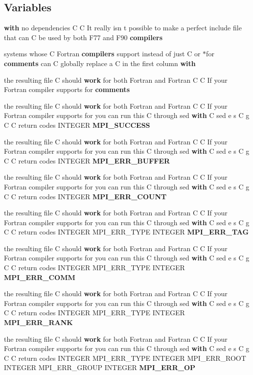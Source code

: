 \subsection*{Variables}
\begin{CompactItemize}
\item 
{\bf with} no dependencies C C It really isn t possible to make a perfect include file that can C be used by both F77 and F90 {\bf compilers}
\item 
systems whose C Fortran {\bf compilers} support instead of just C or $\ast$for {\bf comments} can C globally replace a C in the first column {\bf with}
\item 
the resulting file C should {\bf work} for both Fortran and Fortran C C If your Fortran compiler supports for {\bf comments}
\item 
the resulting file C should {\bf work} for both Fortran and Fortran C C If your Fortran compiler supports for you can run this C through sed {\bf with} C sed e s C g C C return codes INTEGER {\bf MPI\_\-SUCCESS}
\item 
the resulting file C should {\bf work} for both Fortran and Fortran C C If your Fortran compiler supports for you can run this C through sed {\bf with} C sed e s C g C C return codes INTEGER {\bf MPI\_\-ERR\_\-BUFFER}
\item 
the resulting file C should {\bf work} for both Fortran and Fortran C C If your Fortran compiler supports for you can run this C through sed {\bf with} C sed e s C g C C return codes INTEGER {\bf MPI\_\-ERR\_\-COUNT}
\item 
the resulting file C should {\bf work} for both Fortran and Fortran C C If your Fortran compiler supports for you can run this C through sed {\bf with} C sed e s C g C C return codes INTEGER MPI\_\-ERR\_\-TYPE INTEGER {\bf MPI\_\-ERR\_\-TAG}
\item 
the resulting file C should {\bf work} for both Fortran and Fortran C C If your Fortran compiler supports for you can run this C through sed {\bf with} C sed e s C g C C return codes INTEGER MPI\_\-ERR\_\-TYPE INTEGER {\bf MPI\_\-ERR\_\-COMM}
\item 
the resulting file C should {\bf work} for both Fortran and Fortran C C If your Fortran compiler supports for you can run this C through sed {\bf with} C sed e s C g C C return codes INTEGER MPI\_\-ERR\_\-TYPE INTEGER {\bf MPI\_\-ERR\_\-RANK}
\item 
the resulting file C should {\bf work} for both Fortran and Fortran C C If your Fortran compiler supports for you can run this C through sed {\bf with} C sed e s C g C C return codes INTEGER MPI\_\-ERR\_\-TYPE INTEGER MPI\_\-ERR\_\-ROOT INTEGER MPI\_\-ERR\_\-GROUP INTEGER {\bf MPI\_\-ERR\_\-OP}

\end{CompactItemize}
